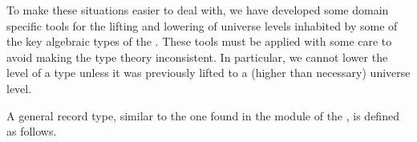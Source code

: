 To make these situations easier to deal with, we have developed some domain specific tools for the lifting and lowering of universe levels inhabited by some of the key algebraic types of the \ualib.  These tools must be applied with some care to avoid making the type theory inconsistent. In particular, we cannot lower the level of a type unless it was previously lifted to a (higher than necessary) universe level.

A general  record type, similar to the one found in the  module of the \agdastdlib, is defined as follows.
\ccpad
\begin{code}%
\>[0]\AgdaSpace{}%
\AgdaSpace{}%
\AgdaSymbol{\{}\AgdaSpace{}%
\AgdaSpace{}%
\AgdaSymbol{:}\AgdaSpace{}%
\AgdaSymbol{\}}\AgdaSpace{}%
\AgdaSymbol{(}\AgdaSpace{}%
\AgdaSymbol{:}\AgdaSpace{}%
\AgdaSpace{}%
\AgdaSymbol{)}\AgdaSpace{}%
\AgdaSymbol{:}\AgdaSpace{}%
\AgdaSpace{}%
\AgdaSpace{}%
\AgdaSpace{}%
%
\>[50]\<%
\\
\>[0][@{}l@{\AgdaIndent{0}}]%
\>[1]\AgdaSpace{}%
\<%
\\
%
\>[1]\AgdaSpace{}%
\AgdaSpace{}%
\AgdaSymbol{:}\AgdaSpace{}%
\<%
\\
\>[0]\AgdaSpace{}%
\<%
\end{code}
\scpad
